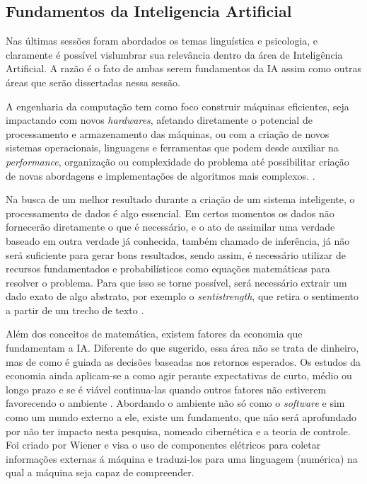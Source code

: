 \subsection{Fundamentos da Inteligencia Artificial}
Nas últimas sessões foram abordados os temas linguística e psicologia, e claramente é possível vislumbrar sua relevância dentro da área de Inteligência Artificial. A razão é o fato de ambas serem fundamentos da IA assim como outras áreas que serão dissertadas nessa sessão.

A engenharia da computação tem como foco construir máquinas eficientes, seja impactando com novos \textit{hardwares}, afetando diretamente o potencial de processamento e armazenamento das máquinas, ou com a criação de novos sistemas operacionais, linguagens e ferramentas que podem desde auxiliar na \textit{performance}, organização ou complexidade do problema até possibilitar criação de novas abordagens e implementações de algoritmos mais complexos. \cite[13-14]{russell2003artificial}.

Na busca de um melhor resultado durante a criação de um sistema inteligente, o processamento de dados é algo essencial. Em certos momentos os dados não fornecerão diretamente o que é necessário, e o ato de assimilar uma verdade baseado em outra verdade já conhecida, também chamado de inferência, já não será suficiente para gerar bons resultados, sendo assim, é necessário utilizar de recursos fundamentados e probabilísticos como equações matemáticas para resolver o problema. Para que isso se torne possível, será necessário extrair um dado exato de algo abstrato, por exemplo o \textit{sentistrength}, que retira o sentimento a partir de um trecho de texto \cite{boole1854investigation}.

Além dos conceitos de matemática, existem fatores da economia que fundamentam a IA. Diferente do que sugerido, essa área não se trata de dinheiro, mas de como é guiada as decisões baseadas nos retornos esperados. Os estudos da economia ainda aplicam-se a como agir perante expectativas de curto, médio ou longo prazo e se é viável continua-las quando outros fatores não estiverem favorecendo o ambiente \cite[9]{russell2003artificial}. Abordando o ambiente não só como o \textit{software} e sim como um mundo externo a ele, existe um fundamento, que não será aprofundado por não ter impacto nesta pesquisa, nomeado cibernética e a teoria de controle. Foi criado por Wiener\cite{wiener1961cybernetics} e visa o uso de componentes elétricos para coletar informações externas á máquina e traduzi-los para uma linguagem (numérica) na qual a máquina seja capaz de compreender.

